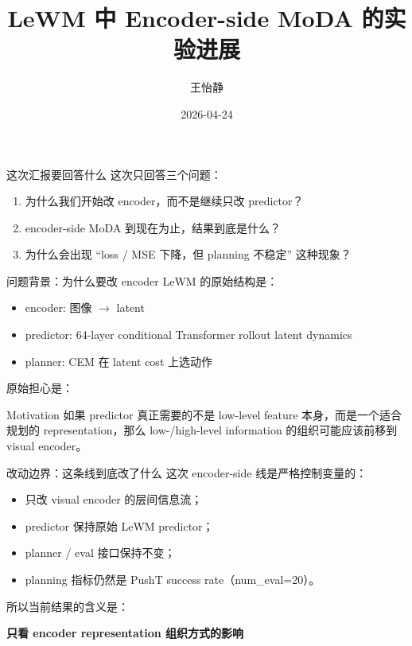 \documentclass[aspectratio=169,11pt]{beamer}
\title{LeWM 中 Encoder-side MoDA 的实验进展}
\author{王怡静}
\date{2026-04-24}
\begin{document}
\begin{frame}
  \titlepage
\end{frame}

\begin{frame}{这次汇报要回答什么}
  这次只回答三个问题：
  \begin{enumerate}
    \item 为什么我们开始改 encoder，而不是继续只改 predictor？
    \item encoder-side MoDA 到现在为止，结果到底是什么？
    \item 为什么会出现 ``loss / MSE 下降，但 planning 不稳定'' 这种现象？
  \end{enumerate}
\end{frame}

\begin{frame}{问题背景：为什么要改 encoder}
  LeWM 的原始结构是：
  \begin{itemize}
    \item encoder: 图像 $\rightarrow$ latent
    \item predictor: 64-layer conditional Transformer rollout latent dynamics
    \item planner: CEM 在 latent cost 上选动作
  \end{itemize}

  原始担心是：
  \begin{block}{Motivation}
    如果 predictor 真正需要的不是 low-level feature 本身，而是一个适合规划的 representation，那么 low-/high-level information 的组织可能应该前移到 visual encoder。
  \end{block}
\end{frame}

\begin{frame}{改动边界：这条线到底改了什么}
  这次 encoder-side 线是严格控制变量的：
  \begin{itemize}
    \item 只改 visual encoder 的层间信息流；
    \item predictor 保持原始 LeWM predictor；
    \item planner / eval 接口保持不变；
    \item planning 指标仍然是 PushT success rate（num\_eval=20）。
  \end{itemize}

  所以当前结果的含义是：
  \begin{center}
    \textbf{只看 encoder representation 组织方式的影响}
  \end{center}
\end{frame}
\end{document}
